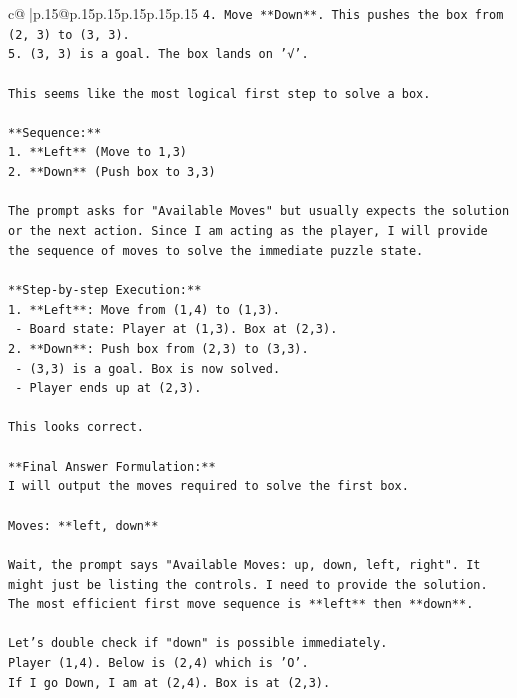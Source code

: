 \documentclass{article}
\begin{document}
{\begin{supertabular}{c@{$\;$}|p{.15\linewidth}@{}p{.15\linewidth}p{.15\linewidth}p{.15\linewidth}p{.15\linewidth}p{.15\linewidth}}
{{{\texttt{4. Move **Down**. This pushes the box from (2, 3) to (3, 3).} \\
\texttt{5. (3, 3) is a goal. The box lands on '√'.} \\
\\ 
\texttt{This seems like the most logical first step to solve a box.} \\
\\ 
\texttt{**Sequence:**} \\
\texttt{1. **Left** (Move to 1,3)} \\
\texttt{2. **Down** (Push box to 3,3)} \\
\\ 
\texttt{The prompt asks for "Available Moves" but usually expects the solution or the next action. Since I am acting as the player, I will provide the sequence of moves to solve the immediate puzzle state.} \\
\\ 
\texttt{**Step{-}by{-}step Execution:**} \\
\texttt{1. **Left**: Move from (1,4) to (1,3).} \\
\texttt{   {-} Board state: Player at (1,3). Box at (2,3).} \\
\texttt{2. **Down**: Push box from (2,3) to (3,3).} \\
\texttt{   {-} (3,3) is a goal. Box is now solved.} \\
\texttt{   {-} Player ends up at (2,3).} \\
\\ 
\texttt{This looks correct.} \\
\\ 
\texttt{**Final Answer Formulation:**} \\
\texttt{I will output the moves required to solve the first box.} \\
\\ 
\texttt{Moves: **left, down**} \\
\\ 
\texttt{Wait, the prompt says "Available Moves: up, down, left, right". It might just be listing the controls. I need to provide the solution.} \\
\texttt{The most efficient first move sequence is **left** then **down**.} \\
\\ 
\texttt{Let's double check if "down" is possible immediately.} \\
\texttt{Player (1,4). Below is (2,4) which is 'O'.} \\
\texttt{If I go Down, I am at (2,4). Box is at (2,3).} \\
}}}
\end{supertabular}}
\end{document}
